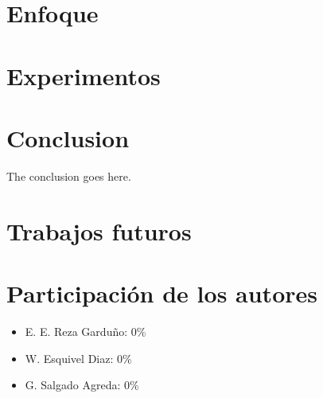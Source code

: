 \documentclass[journal]{IEEEtran}
\begin{document}
\section{Enfoque}

\section{Experimentos}

\section{Conclusion}
The conclusion goes here.

\section{Trabajos futuros}

\section{Participación de los autores}
\begin{itemize}
  \item E. E. Reza Garduño: 0\%
  \item W. Esquivel Diaz: 0\%
  \item G. Salgado Agreda: 0\%
\end{itemize}
\end{document}
